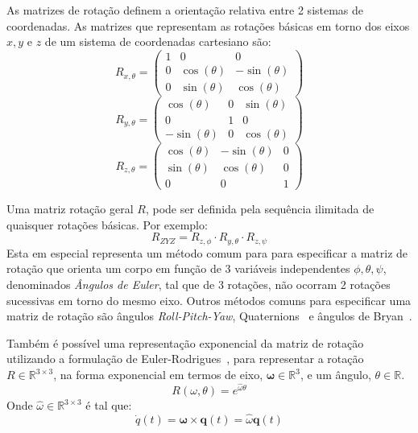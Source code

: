 As matrizes de rotação definem a orientação relativa entre 2 sistemas de
coordenadas. As matrizes que representam as rotações básicas em torno
dos eixos $x, y$ e $z$ de um sistema de coordenadas cartesiano são: 
%
\begin{equation}
	R_{x,\theta} = 
\begin{pmatrix}
1 &0  &0 \\ 
0 &\cos(\theta)  &-\sin(\theta) \\ 
0 &\sin(\theta)  &\cos(\theta) 
\end{pmatrix}
\end{equation}
%
\begin{equation}
R_{y,\theta} = 
\begin{pmatrix}
\cos(\theta) &0  &\sin(\theta) \\ 
0 &1  &0 \\ 
-\sin(\theta) &0  &\cos(\theta) 
\end{pmatrix}
\end{equation}
%
\begin{equation}
R_{z,\theta} = 
\begin{pmatrix}
\cos(\theta) &-\sin(\theta)  &0 \\ 
\sin(\theta) &\cos(\theta)  &0 \\ 
0 &0  &1
\end{pmatrix}
\end{equation}
%

Uma matriz rotação geral $R$, pode ser definida pela sequência ilimitada de
quaisquer rotações básicas. Por exemplo:
%
\begin{equation}
	R_{ZYZ} = R_{z,\phi} \cdot R_{y,\theta} \cdot R_{z,\psi}
\end{equation}
%
Esta em especial representa um método comum para para especificar a matriz de
rotação que orienta um corpo em função de 3 variáveis independentes $\phi,
\theta, \psi$, denominados \emph{Ângulos de Euler}, tal que de 3 rotações, não
ocorram 2 rotações sucessivas em torno do mesmo eixo.
Outros métodos comuns para especificar uma matriz de rotação são ângulos
\textit{Roll-Pitch-Yaw}, Quaternions~\cite{sciavicco2012modelling} e ângulos de
Bryan~\cite{wittenburg2013dynamics}.

Também é possível uma representação exponencial da matriz de rotação utilizando
a formulação de Euler-Rodrigues~\cite{dai2015euler}, para representar a
rotação $R \in \mathbb{R}^{3\times3}$, na forma exponencial em termos de eixo,
$\boldsymbol{\omega} \in \mathbb{R}^{3}$, e um ângulo, $\theta \in \mathbb{R}$.
%
\begin{equation}
	R(\omega, \theta) = e^{\hat{\omega} \theta}
\end{equation}
%
Onde $\hat{\omega} \in \mathbb{R}^{3 \times 3}$ é tal que: 
%
\begin{equation}
	\dot{q}(t) = \boldsymbol{\omega} \times \mathbf{q}(t) = \hat{\omega}
	\mathbf{q}(t)
\end{equation}
%

